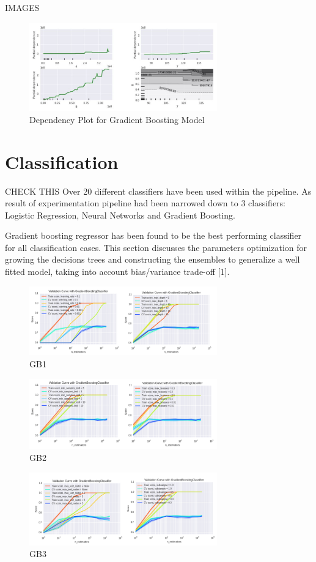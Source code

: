 IMAGES

\begin{figure}[h]
\centering
\includegraphics[width=3.2in]{figures/gradient_boost_dependency}
\caption{Dependency Plot for Gradient Boosting Model \cite{figgradientdep}}
\label{fig:figgradientdep}
\end{figure}
\section{Classification}
CHECK THIS
Over 20 different classifiers have been used within the pipeline. As result of experimentation pipeline had been narrowed down to 3 classifiers: Logistic Regression, Neural Networks and Gradient Boosting.

Gradient boosting regressor has been found to be the best performing classifier for all classification cases. This section discusses the parameters optimization for growing the decisions trees and constructing the ensembles to generalize a well fitted model, taking into account bias/variance trade-off [1].

\begin{figure}[h]
\centering
\includegraphics[width=3.2in]{figures/gb1}
\caption{GB1}
\label{fig:gb1}
\end{figure}
\begin{figure}[h]
\centering
\includegraphics[width=3.2in]{figures/gb2}
\caption{GB2}
\label{fig:gb2}
\end{figure}
\begin{figure}[h]
\centering
\includegraphics[width=3.2in]{figures/gb3}
\caption{GB3}
\label{fig:gb3}
\end{figure}


